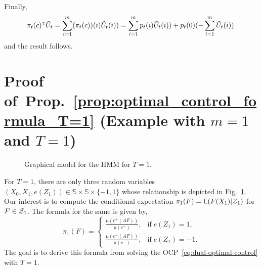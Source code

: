 \documentclass[twoside,11pt]{article}
\def\Fig#1{Fig.~\ref{#1}}
\def\clZ{{\cal Z}}
\def\E{{\sf E}}
\def\Fig#1{Fig.~\ref{#1}}
\def\clZ{{\cal Z}}
\def\bS{\begin{slide}}
\def\E{{\sf E}}
\def\Prop#1{Prop.~\ref{#1}}
\def\clZ{{\cal Z}}
\def\clZ{{\cal Z}}
\def\E{{\sf E}}
\def\bS{\mathbb{S}}
\def\tp{{\hbox{\rm\tiny T}}}
\begin{document}
Finally,
\begin{equation*}
\pi_t(c)^\tp \tilde{U}_t = \sum_{i=1}^m
(\pi_t(c))(i) \tilde{U}_t(i)) = \sum_{i=1}^m p_t(i) \tilde{U}_t(i)) +
p_t(0) (-\sum_{i=1}^m \tilde{U}_t(i)).
\end{equation*}
and the result follows.


\section{Proof of~\Prop{prop:optimal_control_formula_T=1} (Example with $m=1$ and $T=1$)}
\label{sec:simple_case}


\begin{figure}[h]
\begin{center}
  \end{center}
  \vspace*{-20pt}
  \caption{Graphical model for the HMM for $T=1$.}\label{fig:HMM_T=1}
  \end{figure}

For $T=1$, there are only three random variables $(X_0,X_1,e(Z_1)) \in \bS\times \bS \times
\{-1,1\}$ whose relationship is depicted in \Fig{fig:HMM_T=1}. Our
interest is to compute the conditional expectation
$\pi_1(F)=\E(F(X_1)|\clZ_1)$ for $F\in\clZ_1$.  The formula for the
same is given by,
\begin{equation}\label{eq:one_step_filter_formula}
\pi_{1}(F) = \begin{cases} \frac{\mu (c^+ (A F))}{\mu 
    (c^+)}, & \text{if} \; e(Z_{1})=1, \\[5pt]
  \frac{\mu (c^- (A F))}{\mu
    (c^-)}, & \text{if} \; e(Z_{1})=-1. \end{cases} 
\end{equation}
The goal is to derive this formula from solving the OCP~\eqref{eq:dual-optimal-control} with $T=1$. 
\end{document}
